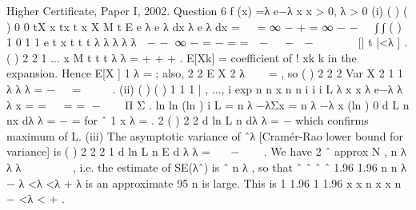 \documentclass[a4paper,12pt]{article}
\begin{document}
Higher Certificate, Paper I, 2002. Question 6
f (x) =λ e−λ x x > 0, λ > 0
(i) ( ) ( )
0 0
tX x tx t x
X M t E e λ e λ dx λ e λ dx =   = ∞ − + = ∞ − −   ∫ ∫
( ) 1
0
1 1
e t x t
t t
λ λ
λ λ λ
 − − ∞ − = − = =  −   −  −      
[| t |<λ ] .
( )
2
2 1 ... x
M t t t
λ λ
= + + + .
E[Xk] = coefficient of
!
xk
k
in the expansion.
Hence E[X ] 1
λ
= ; also, 2
2
E X 2
λ
  = , so ( )
2
2 2
Var X 2 1 1
λ λ λ
= −   =  
 
.
(ii) ( ) ( ) 1
1 1
| , ..., i exp
n n
x n
n i
i i
L λ x x λ e−λ λ λ x
= =
  = = − 
 
Π Σ .
ln ln (ln ) i L = n λ −λΣx = n λ −λ x
(ln )
0
d L n nx
dλ λ
= − = for ˆ 1
x
λ = .
2 ( )
2 2
d ln L n
dλ λ
= − which confirms maximum of L.
(iii) The asymptotic variance of ˆλ [Cramér-Rao lower bound for variance] is
( )
2
2
2
1
d ln L n
E
d
λ
λ
=
 
− 
 
.
We have
2 ˆ approx N ,
n
λ λ λ
 
∼  
 
, i.e. the estimate of SE(λˆ) is
ˆ
n
λ , so that
ˆ ˆ ˆ ˆ 1.96 1.96
n n
λ − λ <λ <λ + λ is an approximate 95%
n is large.
This is 1 1.96 1 1.96
x x n x x n
− <λ < + .
\end{document}
